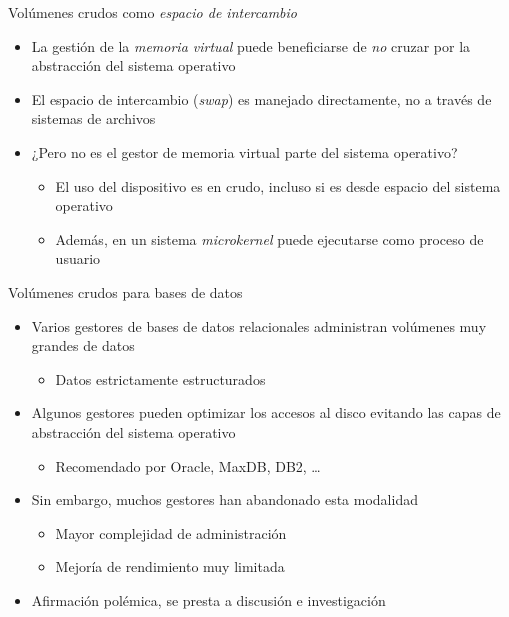 \documentclass[presentation]{beamer}
\begin{document}
\begin{frame}[label={sec:org7263807}]{Volúmenes crudos como \emph{espacio de intercambio}}
\begin{itemize}
\item La gestión de la \emph{memoria virtual} puede beneficiarse de \emph{no}
cruzar por la abstracción del sistema operativo
\item El espacio de intercambio (\emph{swap}) es manejado directamente, no a
través de sistemas de archivos
\item ¿Pero no es el gestor de memoria virtual parte del sistema
operativo?
\begin{itemize}
\item El uso del dispositivo es en crudo, incluso si es desde espacio
del sistema operativo
\item Además, en un sistema \emph{microkernel} puede ejecutarse como proceso
de usuario
\end{itemize}
\end{itemize}
\end{frame}

\begin{frame}[label={sec:org7308dd2}]{Volúmenes crudos para bases de datos}
\begin{itemize}
\item Varios gestores de bases de datos relacionales administran
volúmenes muy grandes de datos
\begin{itemize}
\item Datos estrictamente estructurados
\end{itemize}
\item Algunos gestores pueden optimizar los accesos al disco evitando las
capas de abstracción del sistema operativo
\begin{itemize}
\item Recomendado por Oracle, MaxDB, DB2, \ldots{}
\end{itemize}
\item Sin embargo, muchos gestores han abandonado esta modalidad
\begin{itemize}
\item Mayor complejidad de administración
\item Mejoría de rendimiento muy limitada
\end{itemize}
\item Afirmación polémica, se presta a discusión e investigación
\end{itemize}
\end{frame}
\end{document}
